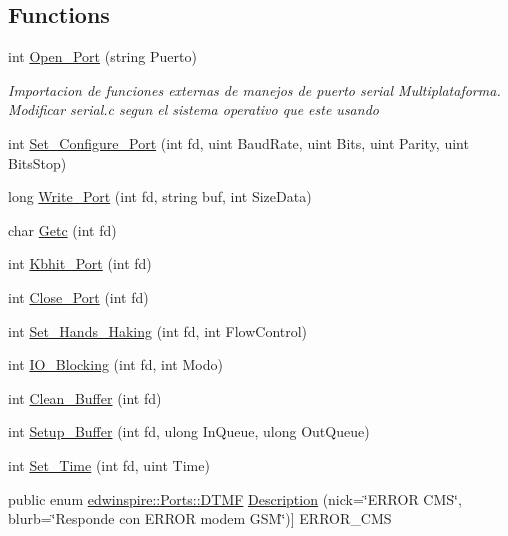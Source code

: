 \subsection*{Functions}
\begin{DoxyCompactItemize}
\item 
int \hyperlink{libspire__serial_8vala_a5257285d61e52d4f38f5b9426643f8e2}{Open\-\_\-\-Port} (string Puerto)
\begin{DoxyCompactList}\small\item\em Importacion de funciones externas de manejos de puerto serial Multiplataforma. Modificar serial.\-c segun el sistema operativo que este usando \end{DoxyCompactList}\item 
int \hyperlink{libspire__serial_8vala_a358f02cfc4dfa7d4c59442be87dcd127}{Set\-\_\-\-Configure\-\_\-\-Port} (int fd, uint Baud\-Rate, uint Bits, uint Parity, uint Bits\-Stop)
\item 
long \hyperlink{libspire__serial_8vala_a438b86765617ff401ee9ac70cd936fbc}{Write\-\_\-\-Port} (int fd, string buf, int Size\-Data)
\item 
char \hyperlink{libspire__serial_8vala_aa54c19e3adbf144d3cb693d776b646c0}{Getc} (int fd)
\item 
int \hyperlink{libspire__serial_8vala_a7e22103cbfa46effeac36fcbbdd752f6}{Kbhit\-\_\-\-Port} (int fd)
\item 
int \hyperlink{libspire__serial_8vala_ab43253c738acffc6d6fc7176ee1aacb6}{Close\-\_\-\-Port} (int fd)
\item 
int \hyperlink{libspire__serial_8vala_a215c51266ce081fa46cb9c1f2f395d0f}{Set\-\_\-\-Hands\-\_\-\-Haking} (int fd, int Flow\-Control)
\item 
int \hyperlink{libspire__serial_8vala_a4d56f13b087367e5ade87176e96285fc}{I\-O\-\_\-\-Blocking} (int fd, int Modo)
\item 
int \hyperlink{libspire__serial_8vala_a740e10aea09874bdeb3c4641aeceb891}{Clean\-\_\-\-Buffer} (int fd)
\item 
int \hyperlink{libspire__serial_8vala_af737482681e97ca6ed05e31f452b7857}{Setup\-\_\-\-Buffer} (int fd, ulong In\-Queue, ulong Out\-Queue)
\item 
int \hyperlink{libspire__serial_8vala_a70231811c32b2be3c76d5e9789c0f608}{Set\-\_\-\-Time} (int fd, uint Time)
\item 
public enum \hyperlink{namespaceedwinspire_1_1_ports_af4e0ec730b70610713b98825eb7c6f53}{edwinspire\-::\-Ports\-::\-D\-T\-M\-F} \hyperlink{namespaceedwinspire_1_1_ports_aca82b59bbf3249fe74227599ba5a813b}{Description} (nick=\char`\"{}E\-R\-R\-O\-R C\-M\-S\char`\"{}, blurb=\char`\"{}Responde con E\-R\-R\-O\-R modem G\-S\-M\char`\"{})\mbox{]} E\-R\-R\-O\-R\-\_\-\-C\-M\-S

\end{DoxyCompactItemize}
